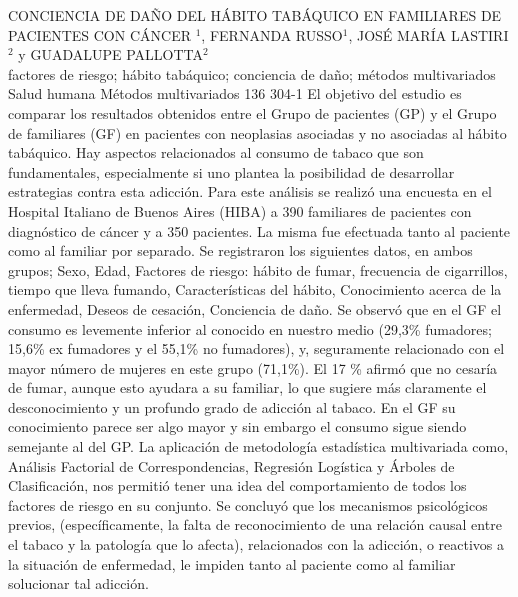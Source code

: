 \A
{CONCIENCIA DE DAÑO DEL HÁBITO TABÁQUICO EN FAMILIARES DE PACIENTES CON CÁNCER}
{$^1$, FERNANDA RUSSO$^1$, JOSÉ MARÍA LASTIRI$^2$ y GUADALUPE PALLOTTA$^2$}
{
\\}
{factores de riesgo; hábito tabáquico; conciencia de daño; métodos multivariados} 
 {Salud humana} 
 {Métodos multivariados} 
 {136} 
 {304-1}
{El objetivo del estudio es comparar los resultados obtenidos entre el Grupo de pacientes (GP) y el Grupo de familiares (GF) en pacientes con neoplasias asociadas y no asociadas al hábito tabáquico. Hay aspectos relacionados al consumo de tabaco que son fundamentales, especialmente si uno plantea la posibilidad de desarrollar estrategias contra esta adicción. Para este análisis se realizó una encuesta en el Hospital Italiano de Buenos Aires (HIBA) a 390 familiares de pacientes con diagnóstico de cáncer y a 350 pacientes. La misma fue efectuada tanto al paciente como al familiar por separado. Se registraron los siguientes datos, en ambos grupos; Sexo, Edad, Factores de riesgo: hábito de fumar, frecuencia de cigarrillos, tiempo que lleva fumando, Características del hábito, Conocimiento acerca de la enfermedad, Deseos de cesación, Conciencia de daño. Se observó que en el GF el consumo es levemente inferior al conocido en nuestro medio (29,3\% fumadores; 15,6\% ex fumadores y el 55,1\% no fumadores), y, seguramente relacionado con el mayor número de mujeres en este grupo (71,1\%). El 17 \% afirmó que no cesaría de fumar, aunque esto ayudara a su familiar, lo que sugiere más claramente el desconocimiento y un profundo grado de adicción al tabaco. En el GF su conocimiento parece ser algo mayor y sin embargo el consumo sigue siendo semejante al del GP. La aplicación de metodología estadística multivariada como, Análisis Factorial de Correspondencias, Regresión Logística y Árboles de Clasificación, nos permitió tener una idea del comportamiento de todos los factores de riesgo en su conjunto. Se concluyó que los mecanismos psicológicos previos, (específicamente, la falta de reconocimiento de una relación causal entre el tabaco y la patología que lo afecta), relacionados con la adicción, o reactivos a la situación de enfermedad, le impiden tanto al paciente como al familiar solucionar tal adicción. }
